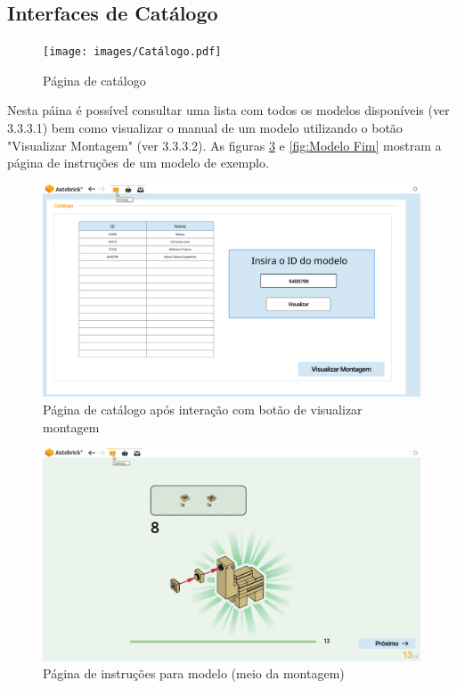         \clearpage
        \subsection{Interfaces de Catálogo}
    
        \begin{figure}[ht]
            \centering
            \texttt{[image: images/Catálogo.pdf]}
            \caption{Página de catálogo}
            \label{fig:Catálogo}
        \end{figure}

    Nesta páina é possível consultar uma lista com todos os modelos disponíveis (ver 3.3.3.1) bem como visualizar o manual de um modelo utilizando o botão "Visualizar Montagem" (ver 3.3.3.2).
    As figuras \ref{fig:Modelo Meio} e \ref{fig:Modelo Fim} mostram a página de instruções de um modelo de exemplo.
    
        \begin{figure}[h!]
            \centering
            \includegraphics[width=0.99\linewidth, frame]{images/Visualizar montagem.pdf}
            \caption{Página de catálogo após interação com botão de visualizar montagem}
            \label{fig:Visualizar modelo}
        \end{figure}
    
        \begin{figure}[h!]
            \centering
            \includegraphics[width=0.99\linewidth, frame]{images/Instructions Manual I.pdf}
            \caption{Página de instruções para modelo (meio da montagem)}
            \label{fig:Modelo Meio}
        \end{figure}
    
